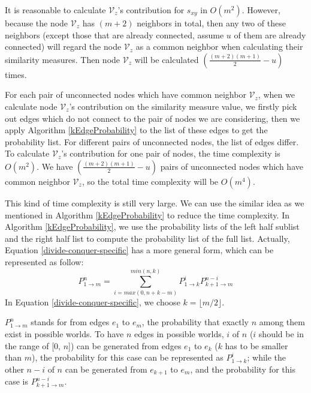 \documentclass[\main/thesis.tex]{subfiles}
\begin{document}
It is reasonable to calculate $\mathcal{V}_z$'s contribution for $s_{xy}$ in $O(m^2)$. However, because the node $\mathcal{V}_z$ has $(m+2)$ neighbors in total, then any two of these neighbors (except those that are already connected, assume $u$ of them are already connected) will regard the node $\mathcal{V}_z$ as a common neighbor when calculating their similarity measures. Then node $\mathcal{V}_z$ will be calculated $(\frac{(m+2)(m+1)}{2}-u)$ times. 


For each pair of unconnected nodes which have common neighbor $\mathcal{V}_z$, when we calculate node $\mathcal{V}_z$'s contribution on the similarity measure value, we firstly pick out edges which do not connect to the pair of nodes we are considering, then we apply Algorithm \ref{kEdgeProbability} to the list of these edges to get the probability list. For different pairs of unconnected nodes, the list of edges differ. To calculate $\mathcal{V}_z$'s contribution for one pair of nodes, the time complexity is $O(m^2)$. We have $(\frac{(m+2)(m+1)}{2}-u)$ pairs of unconnected nodes which have common neighbor $\mathcal{V}_z$, so the total time complexity will be $O(m^4)$.

This kind of time complexity is still very large. We can use the similar idea as we mentioned in Algorithm \ref{kEdgeProbability} to reduce the time complexity. In Algorithm \ref{kEdgeProbability}, we use the probability lists of the left half sublist and the right half list to compute the probability list of the full list. Actually, Equation \ref{divide-conquer-specific} has a more general form, which can be represented as follow:
\begin{equation}
P_{1\rightarrow m}^n=\sum_{i=max(0,n+k-m)}^{min(n,k)}P_{1\rightarrow k}^i P_{k+1\rightarrow m}^{n-i}
\label{divide-conquer-general}
\end{equation}
In Equation \ref{divide-conquer-specific}, we choose $k=\lfloor m/2 \rfloor$.

$P_{1\rightarrow m}^n$ stands for from edges $e_1$ to $e_m$, the probability that exactly $n$ among them exist in possible worlds. To have $n$ edges in possible worlds, $i$ of $n$ ($i$ should be in the range of [0, $n$]) can be generated from edges $e_1$ to $e_k$ ($k$ has to be smaller than $m$), the probability for this case can be represented as $P_{1\rightarrow k}^i$;  while the other $n-i$ of $n$ can be generated from $e_{k+1}$ to $e_m$, and the probability for this case is $P_{k+1\rightarrow m}^{n-i}$.
\end{document}
